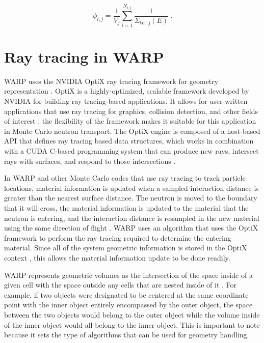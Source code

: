\begin{equation}
\label{tally}
\bar{\phi}_{i,j} = \frac{1}{V_j}\sum_{i=1}^{N_{i,j}}\frac{1}{\Sigma_{\mathrm{tot,j}}(E)}\:.
\end{equation}

\section{Ray tracing in WARP}
\label{sec:rt}

WARP uses the NVIDIA OptiX ray tracing framework for geometry representation \cite{warp2015}. OptiX is a
highly-optimized, scalable framework developed by NVIDIA for building ray tracing-based applications. It
allows for user-written applications that use ray tracing for graphics, collision detection, and other
fields of interest \cite{optix_man}; the flexibility of the framework makes it suitable for this 
application in Monte Carlo neutron transport. The OptiX engine is composed of a host-based API that 
defines ray tracing based data structures, which works in combination with a CUDA C-based programming 
system that can produce new rays, intersect rays with surfaces, and respond to those intersections 
\cite{optix_man}.

In WARP and other Monte Carlo codes that use ray tracing to track particle locations, material information
is updated when a sampled interaction distance is greater than the nearest surface distance. The neutron 
is moved to the boundary that it will cross, the material information is updated to the material that the 
neutron is entering, and the interaction distance is resampled in the new material using the same 
direction of flight \cite{warp2015}. WARP uses an algorithm that uses the OptiX framework to perform the 
ray tracing required to determine the entering material. Since all of the system geometric information is 
stored in the OptiX context \cite{warp2015}, this allows the material information update to be done 
readily. 

WARP represents geometric volumes as the intersection of the space inside of a given cell with the space
outside any cells that are nested inside of it \cite{warp2015}. For example, if two objects were 
designated to be centered at the same coordinate point with the inner object entirely encompassed by the 
outer object, the space between the two objects would belong to the outer object while the volume inside 
of the inner object would all belong to the inner object. This is important to note because it sets the
type of algorithms that can be used for geometry handling.

